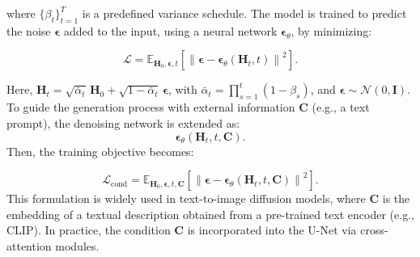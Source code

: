 where \( \{ \beta_t \}_{t=1}^T \) is a predefined variance schedule. The model is trained to predict the noise \( \boldsymbol{\epsilon} \) added to the input, using a neural network \( \boldsymbol{\epsilon}_\theta \), by minimizing:

\begin{equation*}
\mathcal{L} = \mathbb{E}_{\mathbf{H}_0, \boldsymbol{\epsilon}, t} \left[ \left\| \boldsymbol{\epsilon} - \boldsymbol{\epsilon}_\theta(\mathbf{H}_t, t) \right\|^2 \right]. 
\end{equation*} 

Here, \( \mathbf{H}_t = \sqrt{\bar{\alpha}_t} \, \mathbf{H}_0 + \sqrt{1 - \bar{\alpha}_t} \, \boldsymbol{\epsilon} \), with \( \bar{\alpha}_t = \prod_{s=1}^t (1 - \beta_s) \), and \( \boldsymbol{\epsilon} \sim \mathcal{N}(0, \mathbf{I}) \). To guide the generation process with external information \( \mathbf{C} \) (e.g., a text prompt), the denoising network is extended as:
\begin{equation*}
\boldsymbol{\epsilon}_\theta(\mathbf{H}_t, t, \mathbf{C}).
\end{equation*} Then, the training objective becomes:

\begin{equation*}
\mathcal{L}_{\text{cond}} = \mathbb{E}_{\mathbf{H}_0, \boldsymbol{\epsilon}, t, \mathbf{C}} \left[ \left\| \boldsymbol{\epsilon} - \boldsymbol{\epsilon}_\theta(\mathbf{H}_t, t, \mathbf{C}) \right\|^2 \right].
\end{equation*}
This formulation is widely used in text-to-image diffusion models, where \( \mathbf{C} \) is the embedding of a textual description obtained from a pre-trained text encoder (e.g., CLIP). In practice, the condition \( \mathbf{C} \) is incorporated into the U-Net via cross-attention modules. 



